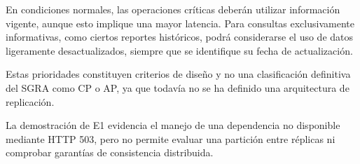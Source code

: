 En condiciones normales, las operaciones críticas deberán utilizar información vigente, aunque esto implique una mayor latencia. Para consultas exclusivamente informativas, como ciertos reportes históricos, podrá considerarse el uso de datos ligeramente desactualizados, siempre que se identifique su fecha de actualización.

Estas prioridades constituyen criterios de diseño y no una clasificación definitiva del SGRA como CP o AP, ya que todavía no se ha definido una arquitectura de replicación.

La demostración de E1 evidencia el manejo de una dependencia no disponible mediante HTTP 503, pero no permite evaluar una partición entre réplicas ni comprobar garantías de consistencia distribuida.